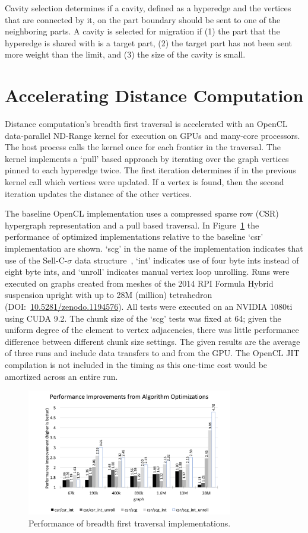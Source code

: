 \documentclass[graybox]{svmult}
\begin{document}
Cavity selection determines if a cavity, defined as a hyperedge and the vertices
that are connected by it, on the part boundary should be sent to one of the
neighboring parts.
A cavity is selected for migration if (1) the part that the hyperedge is shared
with is a target part, (2) the target part has not been sent more weight than
the limit, and (3) the size of the cavity is small.

\section{Accelerating Distance Computation} \label{sec:dist}

Distance computation's breadth first traversal is accelerated with an OpenCL
data-parallel ND-Range kernel for execution on GPUs and many-core processors.
The host process calls the kernel once for each frontier in the traversal.
The kernel implements a `pull' based approach by iterating over the graph
vertices pinned to each hyperedge twice.
The first iteration determines if in the previous kernel call which vertices were
updated.
If a vertex is found, then the second iteration updates the distance of the other
vertices.

The baseline OpenCL implementation uses a compressed sparse row (CSR)
hypergraph representation and a pull based traversal.
In Figure~\ref{fig:bfs} the performance of optimized implementations
relative to the baseline `csr' implementation are shown.
`scg' in the name of the implementation indicates that use of the
Sell-C-$\sigma$ data structure~\cite{sellCSigma}, `int' indicates use of four
byte ints instead of eight byte ints, and `unroll' indicates manual vertex loop
unrolling.
Runs were executed on graphs created from meshes of the 2014 RPI
Formula Hybrid suspension upright with up to 28M (million) tetrahedron
(DOI:~\url{10.5281/zenodo.1194576}).
All tests were executed on an NVIDIA 1080ti using CUDA 9.2.
The chunk size of the `scg' tests was fixed at 64; given the uniform degree of
the element to vertex adjacencies, there was little performance
difference between different chunk size settings.
The given results are the average of three runs and include data transfers to
and from the GPU.
The OpenCL JIT compilation is not included in the timing as this one-time
cost would be amortized across an entire run.

\begin{figure}
  \centering
  \includegraphics[width=0.8\textwidth]{images/bfsPerformance.png}
  \caption{
    Performance of breadth first traversal implementations.
  }
  \label{fig:bfs}
\end{figure}
\end{document}
